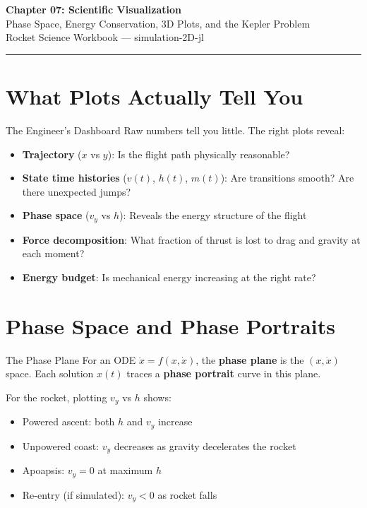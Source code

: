 \documentclass[12pt, a4paper]{article}
\begin{document}
\begin{center}
  {\LARGE \textbf{Chapter 07: Scientific Visualization}}\\[0.5em]
  {\large \textcolor{hintgray}{Phase Space, Energy Conservation, 3D Plots, and the Kepler Problem}}\\[0.3em]
  {\small \textcolor{hintgray}{Rocket Science Workbook — simulation-2D-jl}}
\end{center}
\vspace{1em}\hrule\vspace{1.5em}

\section{What Plots Actually Tell You}

\begin{theorybox}{The Engineer's Dashboard}
Raw numbers tell you little. The right plots reveal:
\begin{itemize}
  \item \textbf{Trajectory} ($x$ vs $y$): Is the flight path physically reasonable?
  \item \textbf{State time histories} ($v(t)$, $h(t)$, $m(t)$): Are transitions smooth? Are there unexpected jumps?
  \item \textbf{Phase space} ($v_y$ vs $h$): Reveals the energy structure of the flight
  \item \textbf{Force decomposition}: What fraction of thrust is lost to drag and gravity at each moment?
  \item \textbf{Energy budget}: Is mechanical energy increasing at the right rate?
\end{itemize}
\end{theorybox}

\section{Phase Space and Phase Portraits}

\begin{theorybox}{The Phase Plane}
For an ODE $\ddot{x} = f(x, \dot{x})$, the \textbf{phase plane} is the $(x, \dot{x})$ space.
Each solution $x(t)$ traces a \textbf{phase portrait} curve in this plane.

For the rocket, plotting $v_y$ vs $h$ shows:
\begin{itemize}
  \item Powered ascent: both $h$ and $v_y$ increase
  \item Unpowered coast: $v_y$ decreases as gravity decelerates the rocket
  \item Apoapsis: $v_y = 0$ at maximum $h$
  \item Re-entry (if simulated): $v_y < 0$ as rocket falls
\end{itemize}
\end{theorybox}
\end{document}
